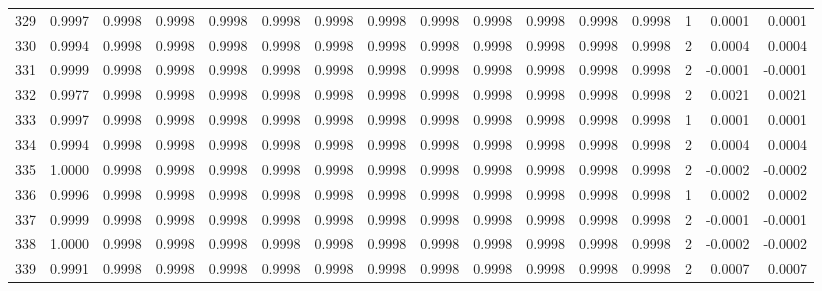 \begin{tabular}{lrrrrrrrrrrrrrrr}
329 &      0.9997 &  0.9998 &  0.9998 &  0.9998 &  0.9998 &  0.9998 &  0.9998 &  0.9998 &  0.9998 &  0.9998 &   0.9998 &     0.9998 &      1 &                    0.0001 &                     0.0001 \\
330 &      0.9994 &  0.9998 &  0.9998 &  0.9998 &  0.9998 &  0.9998 &  0.9998 &  0.9998 &  0.9998 &  0.9998 &   0.9998 &     0.9998 &      2 &                    0.0004 &                     0.0004 \\
331 &      0.9999 &  0.9998 &  0.9998 &  0.9998 &  0.9998 &  0.9998 &  0.9998 &  0.9998 &  0.9998 &  0.9998 &   0.9998 &     0.9998 &      2 &                   -0.0001 &                    -0.0001 \\
332 &      0.9977 &  0.9998 &  0.9998 &  0.9998 &  0.9998 &  0.9998 &  0.9998 &  0.9998 &  0.9998 &  0.9998 &   0.9998 &     0.9998 &      2 &                    0.0021 &                     0.0021 \\
333 &      0.9997 &  0.9998 &  0.9998 &  0.9998 &  0.9998 &  0.9998 &  0.9998 &  0.9998 &  0.9998 &  0.9998 &   0.9998 &     0.9998 &      1 &                    0.0001 &                     0.0001 \\
334 &      0.9994 &  0.9998 &  0.9998 &  0.9998 &  0.9998 &  0.9998 &  0.9998 &  0.9998 &  0.9998 &  0.9998 &   0.9998 &     0.9998 &      2 &                    0.0004 &                     0.0004 \\
335 &      1.0000 &  0.9998 &  0.9998 &  0.9998 &  0.9998 &  0.9998 &  0.9998 &  0.9998 &  0.9998 &  0.9998 &   0.9998 &     0.9998 &      2 &                   -0.0002 &                    -0.0002 \\
336 &      0.9996 &  0.9998 &  0.9998 &  0.9998 &  0.9998 &  0.9998 &  0.9998 &  0.9998 &  0.9998 &  0.9998 &   0.9998 &     0.9998 &      1 &                    0.0002 &                     0.0002 \\
337 &      0.9999 &  0.9998 &  0.9998 &  0.9998 &  0.9998 &  0.9998 &  0.9998 &  0.9998 &  0.9998 &  0.9998 &   0.9998 &     0.9998 &      2 &                   -0.0001 &                    -0.0001 \\
338 &      1.0000 &  0.9998 &  0.9998 &  0.9998 &  0.9998 &  0.9998 &  0.9998 &  0.9998 &  0.9998 &  0.9998 &   0.9998 &     0.9998 &      2 &                   -0.0002 &                    -0.0002 \\
339 &      0.9991 &  0.9998 &  0.9998 &  0.9998 &  0.9998 &  0.9998 &  0.9998 &  0.9998 &  0.9998 &  0.9998 &   0.9998 &     0.9998 &      2 &                    0.0007 &                     0.0007 \\

\end{tabular}
